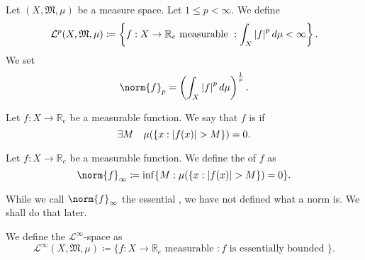 \documentclass[notoc,notitlepage]{tufte-book}
\begin{document}
\begin{defn}\label{defn:_mathcal_l_p_spaces}
  Let $(X, \mathfrak{M}, \mu)$ be a measure space. Let $1 \leq p < \infty$.
  We define
  \begin{equation*}
    \mathcal{L}^p (X, \mathfrak{M}, \mu) \coloneqq \left\{ 
      f : X \to \mathbb{R}_e \text{ measurable } : \int_{X} \left|f\right|^p \mathop{}\!d{\mu} < \infty
    \right\}.
  \end{equation*}
  We set
  \begin{equation*}
    \norm{f}_p = \left( \int_{X} \abs{f}^p \dif{\mu} \right)^{\frac{1}{p}}.
  \end{equation*}
\end{defn}

\begin{defn}\label{defn:essentially_bounded}
  Let $f : X \to \mathbb{R}_e$ be a measurable function.
  We say that $f$ is  if
  \begin{equation*}
    \exists M \quad \mu (\{ x : \left|f(x)\right| > M \}) = 0.
  \end{equation*}
\end{defn}

\begin{defn}\label{defn:essential_norm}
  Let $f : X \to \mathbb{R}_e$ be a measurable function.
  We define the  of $f$ as
  \begin{equation*}
    \norm{f}_{\infty} \coloneqq \inf \{ M : \mu(\{x : \abs{f(x)} > M \}) = 0 \}.
  \end{equation*}
\end{defn}

\begin{note}
  While we call $\norm{f}_{\infty}$ the essential ,
  we have not defined what a norm is.
  We shall do that later.
\end{note}

\begin{defn}\label{defn:_mathcal_l_infty_space}
  We define the $\mathcal{L}^{\infty}$-space as
  \begin{equation*}
    \mathcal{L}^{\infty}(X, \mathfrak{M}, \mu) \coloneqq \{
      f : X \to \mathbb{R}_e \text{ measurable } : f \text{ is essentially bounded }
    \}.
  \end{equation*}
\end{defn}
\end{document}
